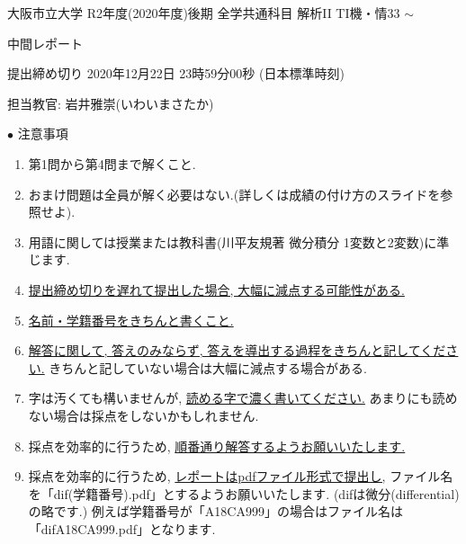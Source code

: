 \documentclass[dvipdfmx,a4paper,11pt]{article}
\theoremstyle{definition}
\begin{document}
\begin{center}
{ \large 大阪市立大学 R2年度(2020年度)後期  全学共通科目 解析II TI機・情33 $\sim$} \\
\vspace{5pt}

{\LARGE 中間レポート } \\
\vspace{5pt}

{ \Large 提出締め切り 2020年12月22日 23時59分00秒 (日本標準時刻)}
\end{center}

\begin{flushright}
 担当教官: 岩井雅崇(いわいまさたか) 
\end{flushright}

{\Large $\bullet$ 注意事項}
\begin{enumerate}
\item 第1問から第4問まで解くこと. 
\item おまけ問題は全員が解く必要はない.(詳しくは成績の付け方のスライドを参照せよ).
\item 用語に関しては授業または教科書(川平友規著 微分積分 1変数と2変数)に準じます.
\item \underline{提出締め切りを遅れて提出した場合, 大幅に減点する可能性がある.}
\item \underline{名前・学籍番号をきちんと書くこと.}
\item \underline{解答に関して, 答えのみならず, 答えを導出する過程をきちんと記してください.} きちんと記していない場合は大幅に減点する場合がある.
\item 字は汚くても構いませんが, \underline{読める字で濃く書いてください.} あまりにも読めない場合は採点をしないかもしれません.%
\item 採点を効率的に行うため, \underline{順番通り解答するようお願いいたします.}
\item 採点を効率的に行うため,  \underline{レポートはpdfファイル形式で提出し,} ファイル名を「dif(学籍番号).pdf」とするようお願いいたします. 
(difは微分(differential)の略です.)
例えば学籍番号が「A18CA999」の場合はファイル名は「difA18CA999.pdf」となります.
\end{enumerate}
\end{document}
